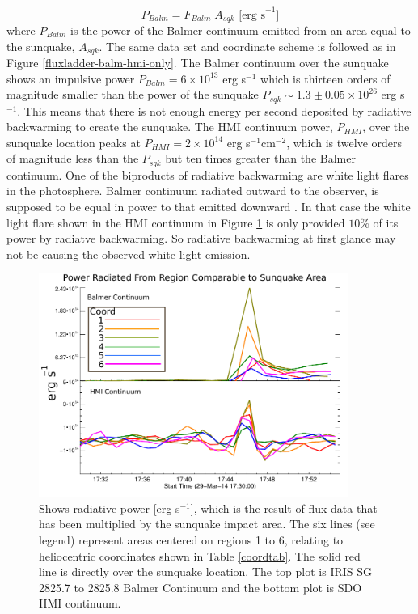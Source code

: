 \begin{equation}
P_{Balm} = F_{Balm} \; A_{sqk}  \text{ [erg s}^{-1}]
\end{equation}\label{Pbalm}
\noindent
where $P_{Balm}$ is the power of the Balmer continuum emitted from an area equal to the sunquake, $A_{sqk}$. The same data set and coordinate scheme is followed as in Figure \ref{fluxladder-balm-hmi-only}. The Balmer continuum over the sunquake shows an impulsive power $P_{Balm} = 6{\times}10^{13}$ erg s$^{-1}$ which is thirteen orders of magnitude smaller than the power of the sunquake $P_{sqk} \sim 1.3\pm0.05{\times}10^{26}$ erg s$^{-1}$. This means that there is not enough energy per second deposited by radiative backwarming to create the sunquake. The HMI continuum power, $P_{HMI}$, over the sunquake location peaks at $P_{HMI} = 2{\times}10^{14}$ erg s$^{-1}$cm$^{-2}$, which is twelve orders of magnitude less than the $P_{sqk}$ but ten times greater than the Balmer continuum. One of the biproducts of radiative backwarming are white light flares in the photosphere. Balmer continuum radiated outward to the observer, is supposed to be equal in power to that emitted downward \citep{1989SoPh..124..303M}. In that case the white light flare shown in the HMI continuum in Figure \ref{powerladder-balm-hmi-only} is only provided $10\%$ of its power by radiatve backwarming. So radiative backwarming at first glance may not be causing the observed white light emission.

\begin{figure}[H]
  \begin{center}
  \includegraphics[width=0.9\textwidth]{29-Mar-14-A_sqk-Power-Ladder-Balm-HMI-Only}
  \end{center}
  \caption{Shows radiative power [erg s$^{-1}$], which is the result of flux data that has been multiplied by the sunquake impact area. The six lines (see legend) represent areas centered on regions 1 to 6, relating to heliocentric coordinates shown in Table \ref{coordtab}. The solid red line is directly over the sunquake location. The top plot is IRIS SG  2825.7 to 2825.8 Balmer Continuum and the bottom plot is SDO HMI continuum.}\label{powerladder-balm-hmi-only}
\end{figure}

